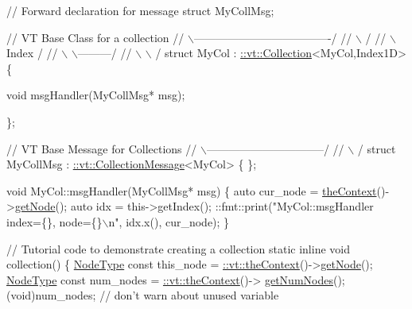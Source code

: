 \begin{DoxyCodeInclude}
\textcolor{comment}{// Forward declaration for message}
\textcolor{keyword}{struct }MyCollMsg;

\textcolor{comment}{//               VT Base Class for a collection}
\textcolor{comment}{//         \(\backslash\)-------------------------------------/}
\textcolor{comment}{//          \(\backslash\)                                   /}
\textcolor{comment}{//           \(\backslash\)                         Index   /}
\textcolor{comment}{//            \(\backslash\)                     \(\backslash\)---------/}
\textcolor{comment}{//             \(\backslash\)                     \(\backslash\)       /}
\textcolor{keyword}{struct }MyCol : \hyperlink{structvt_1_1vrt_1_1collection_1_1_collection}{::vt::Collection}<MyCol,Index1D> \{

  \textcolor{keywordtype}{void} msgHandler(MyCollMsg* msg);

\};

\textcolor{comment}{//                 VT Base Message for Collections}
\textcolor{comment}{//               \(\backslash\)--------------------------------/}
\textcolor{comment}{//                \(\backslash\)                              /}
\textcolor{keyword}{struct }MyCollMsg : \hyperlink{structvt_1_1vrt_1_1collection_1_1_collection_message}{::vt::CollectionMessage}<MyCol> \{ \};

\textcolor{keywordtype}{void} MyCol::msgHandler(MyCollMsg* msg) \{
  \textcolor{keyword}{auto} cur\_node = \hyperlink{namespacevt_a26551fe0e6e6a1371111df5b12c7e92c}{theContext}()->\hyperlink{structvt_1_1ctx_1_1_context_a0d52c263ce8516546a67443d9a86fa5f}{getNode}();
  \textcolor{keyword}{auto} idx = this->getIndex();
  ::fmt::print(\textcolor{stringliteral}{"MyCol::msgHandler index=\{\}, node=\{\}\(\backslash\)n"}, idx.x(), cur\_node);
\}

\textcolor{comment}{// Tutorial code to demonstrate creating a collection}
\textcolor{keyword}{static} \textcolor{keyword}{inline} \textcolor{keywordtype}{void} collection() \{
  \hyperlink{namespacevt_a866da9d0efc19c0a1ce79e9e492f47e2}{NodeType} \textcolor{keyword}{const} this\_node = \hyperlink{namespacevt_a26551fe0e6e6a1371111df5b12c7e92c}{::vt::theContext}()->\hyperlink{structvt_1_1ctx_1_1_context_a0d52c263ce8516546a67443d9a86fa5f}{getNode}();
  \hyperlink{namespacevt_a866da9d0efc19c0a1ce79e9e492f47e2}{NodeType} \textcolor{keyword}{const} num\_nodes = \hyperlink{namespacevt_a26551fe0e6e6a1371111df5b12c7e92c}{::vt::theContext}()->
      \hyperlink{structvt_1_1ctx_1_1_context_a7f41071aadf6d5fa9e1b6c703c5ff19d}{getNumNodes}();
  (void)num\_nodes;  \textcolor{comment}{// don't warn about unused variable}


\end{DoxyCodeInclude}
